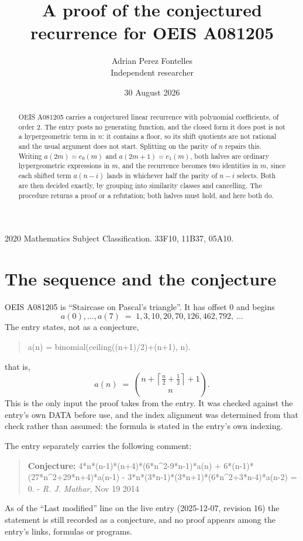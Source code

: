 \documentclass[11pt,a4paper]{article}
\title{A proof of the conjectured recurrence for OEIS A081205}
\author{Adrian Perez Fontelles\\ \small Independent researcher}
\date{30 August 2026}
\theoremstyle{plain}
\theoremstyle{definition}
\begin{document}
\maketitle

\begin{abstract}
OEIS A081205 carries a conjectured linear recurrence with polynomial coefficients, of
order 2. The entry posts no generating function, and the closed form it does post
is not a hypergeometric term in $n$: it contains a floor, so its shift quotients are not
rational and the usual argument does not start. Splitting on the parity of $n$ repairs
this. Writing $a(2m)=e_{0}(m)$ and $a(2m+1)=e_{1}(m)$, both halves are ordinary
hypergeometric expressions in $m$, and the recurrence becomes two identities in $m$, since
each shifted term $a(n-i)$ lands in whichever half the parity of $n-i$ selects. Both are
then decided exactly, by grouping into similarity classes and cancelling. The procedure
returns a proof or a refutation; both halves must hold, and here both do.
\end{abstract}

\noindent\small 2020 Mathematics Subject Classification. 33F10, 11B37, 05A10.\normalsize

\section{The sequence and the conjecture}

OEIS A081205 is ``Staircase on Pascal's triangle''. It has offset $0$ and begins
\[
a(0),\dots,a(7)\;=\;1, 3, 10, 20, 70, 126, 462, 792,\ \dots
\]
The entry states, not as a conjecture,
\begin{quote}\small
a(n) = binomial(ceiling((n+1)/2)+(n+1), n).
\end{quote}
that is,
\begin{equation}\label{eq:cf}
a(n)\;=\;{\binom{n + \left\lceil{\frac{n}{2} + \frac{1}{2}}\right\rceil + 1}{n}} .
\end{equation}
This is the only input the proof takes from the entry. It was checked against the entry's
own DATA before use, and the index alignment was determined from that check rather than
assumed: the formula is stated in the entry's own indexing.

The entry separately carries the following comment:
\begin{quote}\small
\textbf{Conjecture:} 4*n*(n-1)*(n+4)*(6*n\^{}2-9*n-1)*a(n) + 6*(n-1)*(27*n\^{}2+29*n+4)*a(n-1) - 3*n*(3*n-1)*(3*n+1)*(6*n\^{}2+3*n-4)*a(n-2) = 0. - \emph{R. J. Mathar}, Nov 19 2014
\end{quote}
As of the ``Last modified'' line on the live entry (2025-12-07, revision 16) the
statement is still recorded as a conjecture, and no proof appears among the entry's links,
formulas or programs.
\end{document}
